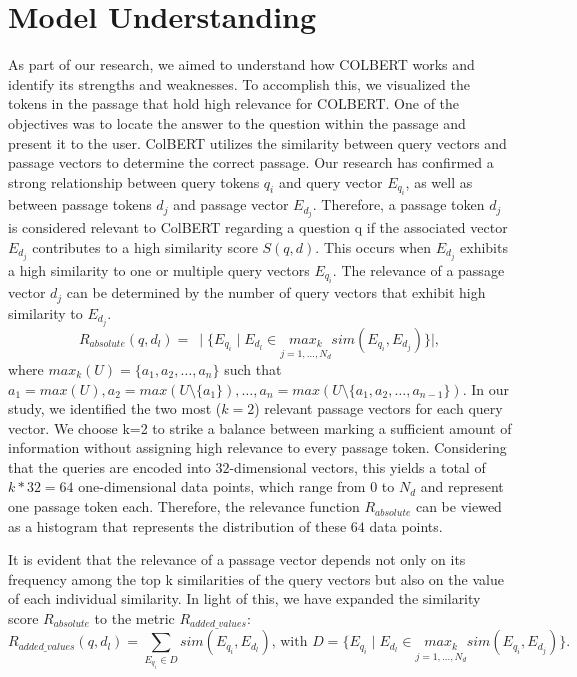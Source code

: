 \documentclass{article}
\begin{document}
\section{Model Understanding}
As part of our research, we aimed to understand how COLBERT works and identify its strengths and weaknesses.
To accomplish this, we visualized the tokens in the passage that hold high relevance for COLBERT. One of the objectives
was to locate the answer to the question within the passage and present it to the user.
ColBERT utilizes the similarity between query vectors and passage vectors to determine the correct passage.
Our research has confirmed a strong relationship between query tokens $q_i$ and query vector $E_{q_i}$, as well as between
passage tokens $d_j$ and passage vector $E_{d_j}$.
Therefore, a passage token $d_j$ is considered relevant to ColBERT regarding
a question q if the associated vector $E_{d_j}$ contributes to a high similarity score $S(q, d)$.
This occurs when $E_{d_j}$ exhibits a high similarity to one or multiple query vectors $E_{q_i}$.
The relevance of a passage vector $d_j$ can be determined by the number of query vectors that exhibit high similarity
to $E_{d_j}$.
$$
    R_{absolute}(q, d_l) = \:\mid \{E_{q_i} \mid E_{d_l} \in \underset{j = 1, \dots, N_d}{max_k} sim(E_{q_i}, E_{d_j})\} \mid,
$$
where $max_k(U) = \{a_1, a_2, \dots, a_n\}$ such that $a_1 = max(U), a_2 = max(U \setminus \{a_1\}), \dots, a_n = max(U \setminus \{a_1, a_2, \dots, a_{n-1}\})$.
In our study, we identified the two most ($k=2$) relevant passage vectors for each query vector.
We choose k=2 to strike a balance between marking a sufficient amount of information without assigning high relevance to every passage token. 
Considering that the queries are encoded into $32$-dimensional vectors, 
this yields a total of $k*32=64$ one-dimensional data points, which range from $0$ to $N_d$ and represent one passage token each.
Therefore, the relevance function $R_{absolute}$ can be viewed as a histogram that represents the distribution of these $64$ data points.

It is evident that the relevance of a passage vector depends not only on its frequency among the top k similarities of the query vectors
 but also on the value of each individual similarity.
In light of this, we have expanded the similarity score $R_{absolute}$ to the metric $R_{added\_values}$:
$$
	R_{added\_values}(q, d_l) = \sum_{E_{q_i} \in D} sim(E_{q_i}, E_{d_l}) \text{, with } D= \{E_{q_i} \mid E_{d_l} \in \underset{j = 1, \dots, N_d}{max_k} sim(E_{q_i}, E_{d_j})\}.
$$
\end{document}
